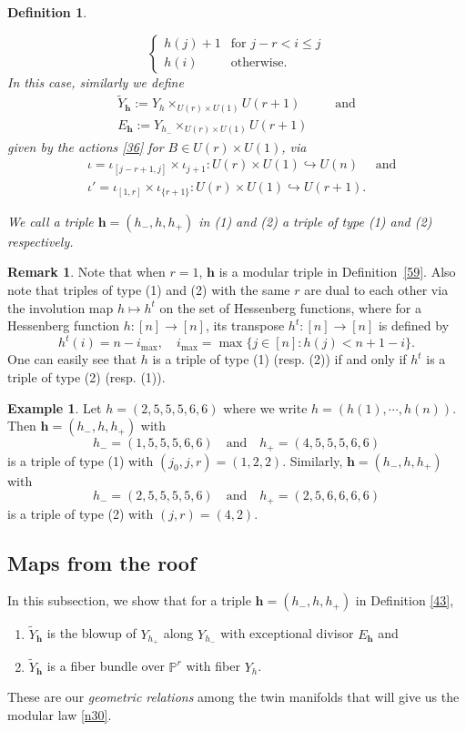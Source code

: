 \documentclass[11pt]{article}
\newtheorem{definition}[theo]{Definition}
\theoremstyle{definition}
\newtheorem{remark}[theo]{Remark}
\newtheorem{example}[theo]{Example}
\numberwithin{equation}{section}
\numberwithin{equation}{section}
\newcommand{\PP}{\mathbb{P}}
\newcommand\tY{{\widetilde{Y}}}
\newcommand{\aand}{\quad\text{and}\quad}
\newcommand\bh{\mathbf{h}}
\begin{document}
\begin{definition}
\begin{enumerate}
\[\begin{cases}
			h(j)+1 &\text{for }j-r<i\leq j\\
		h(i) &\text{otherwise.}
		\end{cases}\]
		In this case, similarly we define 
		\begin{equation*}
			\begin{split}
				\tY_\bh :=Y_h\times_{U(r)\times U(1)}U(r+1)& \quad \text{ and}\\
				E_\bh:=Y_{h_-}\times_{U(r)\times U(1)}U(r+1)&
			\end{split}
		\end{equation*}
		given by the actions \eqref{36} for $B\in U(r)\times U(1)$,
		via 
		\begin{equation*}
			\begin{split}
				&\iota=\iota_{[j-r+1,j]}\times \iota_{j+1}:U(r)\times U(1)\hookrightarrow U(n) \quad \text{ and}\\
				&\iota'=\iota_{[1,r]}\times \iota_{\{r+1\}}:U(r)\times U(1)\hookrightarrow U(r+1).
			\end{split}
		\end{equation*} 
	\end{enumerate}
	We call a triple $\bh=(h_-,h,h_+)$ in (1) and (2) a triple of \emph{type (1)} and \emph{(2)} respectively.
\end{definition}
\begin{remark}\label{r1}
Note that when $r=1$, $\bh$ is a modular triple in Definition~\ref{59}.
Also note that triples of type (1) and (2) with the same $r$ are dual to each other via the involution map $h\mapsto h^t$ on the set of Hessenberg functions, where for a Hessenberg function $h:[n]\to[n]$, its transpose $h^t:[n]\to [n]$ is defined by
\[h^t(i)=n-i_{\max}, \quad  i_{\max}=\max\{j\in [n]:h(j)<n+1-i\}.\]
One can easily see that $h$ is a triple of type (1) (resp. (2)) if and only if $h^t$ is a triple of type (2) (resp. (1)). 
\end{remark}


\begin{example}\label{8}
	Let $h=(2,5,5,5,6,6)$ where we write $h=(h(1),\cdots, h(n))$.
	Then $\bh=(h_-,h,h_+)$ with 
	\[h_-=(1,5,5,5,6,6) \aand h_+=(4,5,5,5,6,6)\]
	 is a triple of type (1) with $(j_0,j,r)=(1,2,2)$. Similarly, $\bh=(h_-,h,h_+)$ with 
	 \[h_-=(2,5,5,5,5,6) \aand h_+=(2,5,6,6,6,6)\]
	 is a triple of type (2) with $(j,r)=(4,2)$.	 
\end{example}

\subsection{Maps from the roof}
In this subsection, we show that for a triple $\bh=(h_-,h,h_+)$ in Definition \ref{43}, \begin{enumerate}
\item[(* )] $\tY_\bh$ is the blowup of $Y_{h_+}$ along $Y_{h_-}$ with exceptional divisor $E_\bh$  and 
\item[(**)] $\tY_\bh$ is a fiber bundle over $\PP^r$ with fiber $Y_h$.
\end{enumerate} 
These are our \emph{geometric relations} among the twin manifolds  
that will give us the modular law \eqref{n30}. 
\end{document}
